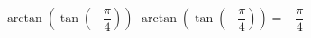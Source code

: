  {$\arctan\left(\tan\left(-\dfrac{\pi}{4}\right) \right)$ }
{ $\arctan\left(\tan\left(-\dfrac{\pi}{4}\right) \right) = -\dfrac{\pi}{4}$}
